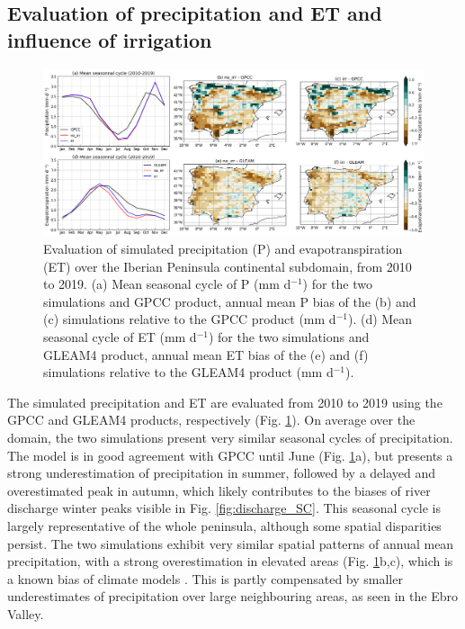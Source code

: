 \clearpage

\subsection{Evaluation of precipitation and ET and influence of irrigation}

\begin{figure}[htbp]
    \centering
    \includegraphics[width=\textwidth]{images/chap4/f06.png}
    \caption{Evaluation of simulated precipitation (P) and evapotranspiration (ET) over the Iberian Peninsula continental subdomain, from 2010 to 2019. 
    (a) Mean seasonal cycle of P (mm d$^{-1}$) for the two simulations and GPCC product, annual mean P bias of the (b) \noirr and (c) \irr simulations relative to the GPCC product (mm d$^{-1}$).
    (d) Mean seasonal cycle of ET (mm d$^{-1}$) for the two simulations and GLEAM4 product, annual mean ET bias of the (e) \noirr and (f) \irr simulations relative to the GLEAM4 product (mm d$^{-1}$).}
    \label{fig:sim_eval_ET_P}
\end{figure}

The simulated precipitation and ET are evaluated from 2010 to 2019 using the GPCC and GLEAM4 products, respectively (Fig. \ref{fig:sim_eval_ET_P}).
On average over the domain, the two simulations present very similar seasonal cycles of precipitation. The model is in good agreement with GPCC until June (Fig. \ref{fig:sim_eval_ET_P}a), but presents a strong underestimation of precipitation in summer, followed by a delayed and overestimated peak in autumn, which likely contributes to the biases of river discharge winter peaks visible in Fig. \ref{fig:discharge_SC}. 
This seasonal cycle is largely representative of the whole peninsula, although some spatial disparities persist. The two simulations exhibit very similar spatial patterns of annual mean precipitation, with a strong overestimation in elevated areas (Fig. \ref{fig:sim_eval_ET_P}b,c), which is a known bias of climate models \citep{arjdal_modeling_2024, adhikari_evaluation_2024}.
This is partly compensated by smaller underestimates of precipitation over large neighbouring areas, as seen in the Ebro Valley.

